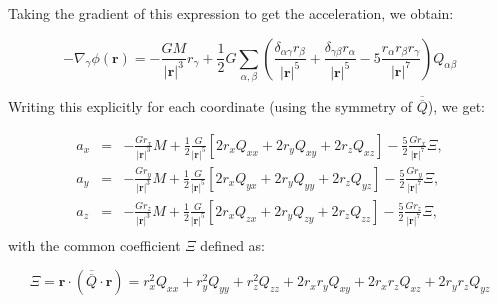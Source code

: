 \documentclass[a4paper,10pt]{article}
\newcommand{\rr}{\mathbf{r}}
\begin{document}
Taking the gradient of this expression to get the acceleration, we obtain:

\begin{equation}
 -\nabla_\gamma\phi(\rr)= -\frac{GM}{|\rr|^3} r_\gamma + 
\frac{1}{2}G\sum_{\alpha,\beta}\left(\frac{\delta_{\alpha\gamma}r_\beta}{|\rr|^5} + 
\frac{\delta_{\gamma\beta}r_\alpha}{|\rr|^5} -5\frac{r_\alpha r_\beta r_\gamma}{|\rr|^7}\right)Q_{\alpha\beta}
\end{equation}

Writing this explicitly for each coordinate (using the symmetry of $\overline{\overline{Q}}$), we get:

\begin{eqnarray}
 a_x &=& -\frac{Gr_x}{|\rr|^3}M + \frac{1}{2} \frac{G}{|\rr|^5}\left[2r_x Q_{xx} + 2r_yQ_{xy} + 2r_z Q_{xz}\right] - 
\frac{5}{2} \frac{G r_x}{|\rr|^7} \Xi, \\
 a_y &=& -\frac{Gr_y}{|\rr|^3}M + \frac{1}{2} \frac{G}{|\rr|^5}\left[2r_x Q_{yx} + 2r_yQ_{yy} + 2r_z Q_{yz}\right] - 
\frac{5}{2} \frac{G r_y}{|\rr|^7} \Xi, \\
 a_z &=& -\frac{Gr_z}{|\rr|^3}M + \frac{1}{2} \frac{G}{|\rr|^5}\left[2r_x Q_{zx} + 2r_yQ_{zy} + 2r_z Q_{zz}\right] - 
\frac{5}{2} \frac{G r_z}{|\rr|^7} \Xi, \\
\end{eqnarray}
with the common coefficient $\Xi$ defined as:

\begin{equation*}
 \Xi = \rr\cdot(\overline{\overline{Q}}\cdot \rr) = r_x^2Q_{xx} + r_y^2Q_{yy} + r_z^2Q_{zz} + 2r_xr_yQ_{xy} + 
2r_xr_zQ_{xz} + 2r_yr_zQ_{yz}
\end{equation*}
\end{document}
